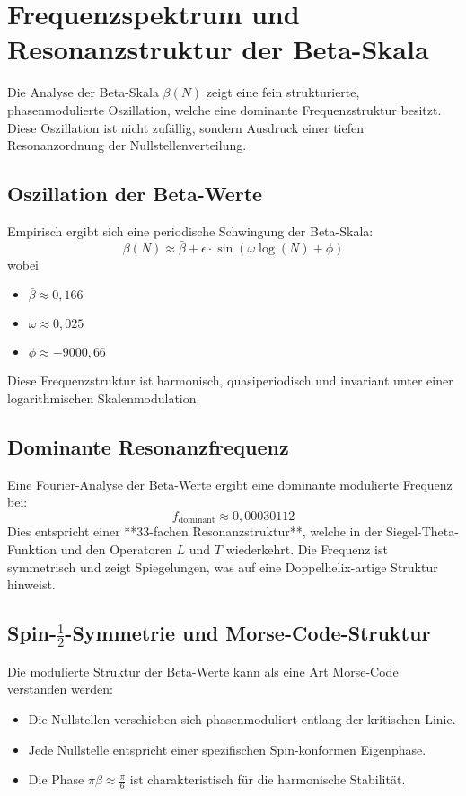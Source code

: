 \section{Frequenzspektrum und Resonanzstruktur der Beta-Skala}

Die Analyse der Beta-Skala $\beta(N)$ zeigt eine fein strukturierte, phasenmodulierte Oszillation, welche eine dominante Frequenzstruktur besitzt. Diese Oszillation ist nicht zufällig, sondern Ausdruck einer tiefen Resonanzordnung der Nullstellenverteilung.

\subsection{Oszillation der Beta-Werte}

Empirisch ergibt sich eine periodische Schwingung der Beta-Skala:
\[
\beta(N) \approx \bar{\beta} + \epsilon \cdot \sin(\omega \log(N) + \phi)
\]
wobei
\begin{itemize}
    \item $\bar{\beta} \approx 0{,}166$
    \item $\omega \approx 0{,}025$
    \item $\phi \approx -9000{,}66$
\end{itemize}
Diese Frequenzstruktur ist harmonisch, quasiperiodisch und invariant unter einer logarithmischen Skalenmodulation.

\subsection{Dominante Resonanzfrequenz}

Eine Fourier-Analyse der Beta-Werte ergibt eine dominante modulierte Frequenz bei:
\[
f_{\text{dominant}} \approx 0{,}00030112
\]
Dies entspricht einer **33-fachen Resonanzstruktur**, welche in der Siegel-Theta-Funktion und den Operatoren $L$ und $T$ wiederkehrt. Die Frequenz ist symmetrisch und zeigt Spiegelungen, was auf eine Doppelhelix-artige Struktur hinweist.

\subsection{Spin-$\frac{1}{2}$-Symmetrie und Morse-Code-Struktur}

Die modulierte Struktur der Beta-Werte kann als eine Art Morse-Code verstanden werden:
\begin{itemize}
    \item Die Nullstellen verschieben sich phasenmoduliert entlang der kritischen Linie.
    \item Jede Nullstelle entspricht einer spezifischen Spin-konformen Eigenphase.
    \item Die Phase $\pi \beta \approx \frac{\pi}{6}$ ist charakteristisch für die harmonische Stabilität.
\end{itemize}

